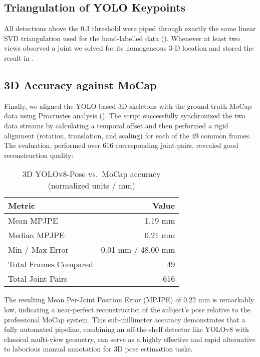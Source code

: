 \documentclass[11pt,a4paper]{article}
\begin{document}
\subsection*{Triangulation of YOLO Keypoints}

All detections above the 0.3 threshold were piped through exactly the same linear SVD triangulation used for the hand-labelled data (). Whenever at least two views observed a joint we solved for its homogeneous 3-D location and stored the result in .

\subsection*{3D Accuracy against MoCap}  
Finally, we aligned the YOLO-based 3D skeletons with the ground truth MoCap data using Procrustes analysis (). The script successfully synchronized the two data streams by calculating a temporal offset and then performed a rigid alignment (rotation, translation, and scaling) for each of the 49 common frames. The evaluation, performed over 616 corresponding joint-pairs, revealed good reconstruction quality:

\begin{table}[h]
  \centering
  \caption{3D YOLOv8-Pose vs.\ MoCap accuracy (normalized units / mm)}
  \label{tab:yolo3d-accuracy}
  \begin{tabular}{l r}
    \toprule
    \textbf{Metric}              & \textbf{Value}      \\
    \midrule
    Mean MPJPE                   & 1.19 mm             \\
    Median MPJPE                 & 0.21 mm             \\
    Min / Max Error              & 0.01 mm / 48.00 mm  \\
    Total Frames Compared        & 49                  \\
    Total Joint Pairs            & 616                 \\
    \bottomrule
  \end{tabular}
\end{table}

The resulting Mean Per-Joint Position Error (MPJPE) of 0.22 mm is remarkably low, indicating a near-perfect reconstruction of the subject’s pose relative to the professional MoCap system. This sub-millimeter accuracy demonstrates that a fully automated pipeline, combining an off-the-shelf detector like YOLOv8 with classical multi-view geometry, can serve as a highly effective and rapid alternative to laborious manual annotation for 3D pose estimation tasks.
\end{document}
